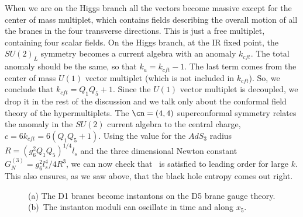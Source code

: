 When we are on the Higgs branch all the vectors become massive 
except for the center of mass multiplet, which contains fields
describing the overall motion of all the branes in the four 
transverse directions. This is just a free multiplet, containing
four scalar fields. 
 On the Higgs branch, at the  
 IR fixed point, the $SU(2)_L$ symmetry becomes a current 
algebra with an anomaly $k_{cft}$. 
The total anomaly should be the same, so that $k_a = k_{cft} -1$.
The last term comes from the center of mass $U(1)$ vector multiplet
(which is not included in $k_{cft}$). 
So, we conclude that $k_{cft} = Q_1Q_5 +1 $. 
Since the $U(1)$ vector multiplet is decoupled, we drop it in the rest
of the discussion and we talk only about the conformal field theory
of the hypermultiplets. 
The $\cn=(4,4)$ superconformal
symmetry relates the anomaly in the $SU(2)$ current algebra to the
central charge,  $ c = 6k_{cft} = 6 ( Q_1Q_5 +1) $. 
Using the value for
the $AdS_3$ radius $R = ( g_6^2 Q_1 Q_5)^{1/4} l_s$ and the three dimensional
Newton constant $G_N^{(3)} = g_6^2 l_s^4 / 4 R^3$, we
 can now check that \brown\ is satisfied to leading order for large $k$.
This also ensures, as we saw above, that the black hole entropy comes
out right. 


\begin{figure}[htb]
\begin{center}
\epsfxsize=3in\leavevmode{}
\end{center}
\caption{
(a) The D1 branes become instantons on the D5 brane gauge theory.
(b)~The instanton moduli can oscillate in time and along $x_5$. 
}
\label{instantons}
\end{figure} 


